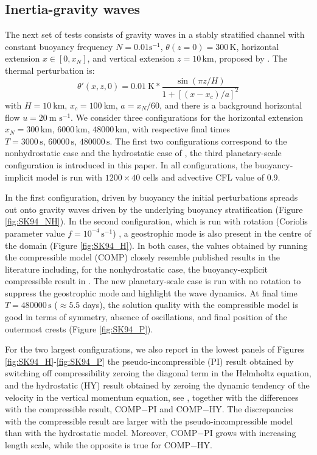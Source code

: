 \documentclass{ametsoc}
\theoremstyle{definition}
\begin{document}
\subsection{Inertia-gravity waves} 

The next set of tests consists of gravity waves in a stably stratified channel with constant buoyancy frequency $N=0.01\textrm{s}^{-1}$, $\theta(z=0)=300\,\textrm{K}$, horizontal extension $x\in[0,x_N]$, and vertical extension $z=10\,\textrm{km}$, proposed by \cite{SkamarockKlemp1994}. The thermal perturbation is:
%
\begin{equation}
 \theta'(x, z, 0)=0.01~\textrm{K}*\dfrac{\sin(\pi z/H)}{1+[(x-x_c)/a]^2}\label{eq: init_theta_pert_igw} 
\end{equation} 
%
with $H=10~\textrm{km}$, $x_c=100~\textrm{km}$, $a=x_N/60$, and there is a background horizontal flow $u=20~\textrm{m s}^{-1}$. We consider three configurations for the horizontal extension $x_N=300\,\textrm{km},\,6000\,\textrm{km},\,48000\,\textrm{km}$, with respective final times $T=3000\,\textrm{s},\,60000\,\textrm{s},\,480000\,\textrm{s}$. The first two configurations correspond to the nonhydrostatic case and the hydrostatic case of \cite{SkamarockKlemp1994}, the third planetary-scale configuration is introduced in this paper. In all configurations, the buoyancy-implicit model is run with $1200\times40$ cells and advective CFL value of 0.9. 

In the first configuration, driven by buoyancy the initial perturbations spreads out onto gravity waves driven by the underlying buoyancy stratification (Figure \ref{fig:SK94_NH}). In the second configuration, which is run with rotation (Coriolis parameter value $f=10^{-4}\,\textrm{s}^{-1}$) , a geostrophic mode is also present in the centre of the domain (Figure \ref{fig:SK94_H}). In both cases, the values obtained by running the compressible model (COMP) closely resemble published results in the literature including, for the nonhydrostatic case, the buoyancy-explicit compressible result in \cite{BenacchioEtAl2014}. The new planetary-scale case is run with no rotation to suppress the geostrophic mode and highlight the wave dynamics. At final time $T=480000\,\textrm{s}$ ($\approx5.5$ days), the solution quality with the compressible model is good in terms of symmetry, absence of oscillations, and final position of the outermost crests (Figure \ref{fig:SK94_P}).  

For the two largest configurations, we also report in the lowest panels of Figures \ref{fig:SK94_H}-\ref{fig:SK94_P} the pseudo-incompressible (PI) result obtained by switching off compressibility zeroing the diagonal term in the Helmholtz equation, and the hydrostatic (HY) result obtained by zeroing the dynamic tendency of the velocity in the vertical momentum equation, see \cite{BenacchioEtAl2014, KleinBenacchio2016}, together with the differences with the compressible result, COMP$-$PI and COMP$-$HY. The discrepancies with the compressible result are larger with the pseudo-incompressible model than with the hydrostatic model. Moreover, COMP$-$PI grows with increasing length scale, while the opposite is true for COMP$-$HY.  
\end{document}
